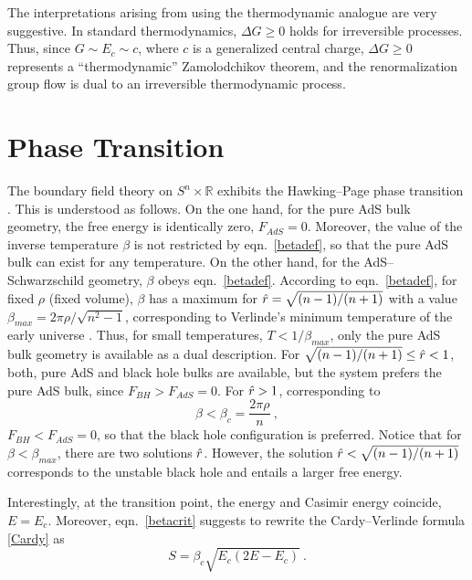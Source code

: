 \documentclass[a4paper,12pt]{article}
\begin{document}
The interpretations arising from using the thermodynamic analogue are very
suggestive. In standard thermodynamics, $\Delta G \ge0$ holds for irreversible
processes. Thus, since $G\sim E_c\sim c$, where $c$ is a generalized
central charge, $\Delta G\ge0$ represents a ``thermodynamic''
Zamolodchikov theorem, and the renormalization group flow is dual to
an irreversible thermodynamic process.


\section{Phase Transition}
\label{landau}
The boundary field theory on $S^n{\times} \mathbb{R}$ exhibits the
Hawking--Page phase transition \cite{Hawking83}. This is understood as
follows. On the one hand, for the pure AdS bulk geometry, the free
energy is identically zero, $F_{AdS}=0$. Moreover, the value of the inverse
temperature $\beta$ is not restricted by eqn.\ \eqref{betadef}, so
that the pure AdS bulk can exist for any temperature. On the
other hand, for the AdS--Schwarzschild geometry, $\beta$ obeys eqn.\
\eqref{betadef}. According to eqn.\ \eqref{betadef}, for fixed $\rho$
(fixed volume), $\beta$ has a maximum for $\hat{r}=\sqrt{(n-1)/(n+1)}$ with
a value $\beta_{max} = 2\pi \rho/\sqrt{n^2-1}$, corresponding to
Verlinde's minimum temperature of the early universe
\cite{Verlinde00}. Thus, for small
temperatures, $T<1/\beta_{max}$, only the pure AdS bulk geometry is
available as a dual description. For $\sqrt{(n-1)/(n+1)}\le \hat{r} <1$,
both, pure AdS and black hole bulks are available, but the
system prefers the pure AdS bulk, since $F_{BH}>F_{AdS}=0$. For
$\hat{r}>1$, corresponding to
\begin{equation}
\label{betacrit}
  \beta < \beta_c = \frac{2\pi\rho}n~,
\end{equation}
$F_{BH}<F_{AdS}=0$, so that the black hole configuration is
preferred. Notice that for $\beta<\beta_{max}$, there are two
solutions $\hat{r}$. However, the solution $\hat{r} <
\sqrt{(n-1)/(n+1)}$ corresponds to the unstable black hole
\cite{Hawking83} and entails a larger free energy.

Interestingly, at the transition point, the energy and
Casimir energy coincide, $E=E_c$. Moreover, eqn.\ \eqref{betacrit}
suggests to rewrite the Cardy--Verlinde formula \eqref{Cardy} as
\begin{equation}
\label{Cardy2}
  S = \beta_c \sqrt{E_c(2E-E_c)}~.
\end{equation}
\end{document}
